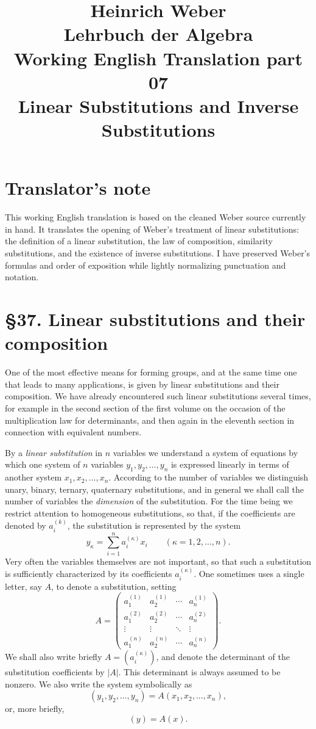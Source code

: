 \documentclass[11pt]{article}
\title{Heinrich Weber\\Lehrbuch der Algebra\\Working English Translation part 07\\Linear Substitutions and Inverse Substitutions}
\author{}
\date{}
\begin{document}
\maketitle

\section*{Translator's note}
This working English translation is based on the cleaned Weber source currently in hand. It translates the opening of Weber's treatment of linear substitutions: the definition of a linear substitution, the law of composition, similarity substitutions, and the existence of inverse substitutions. I have preserved Weber's formulas and order of exposition while lightly normalizing punctuation and notation.

\section*{\S 37. Linear substitutions and their composition}

One of the most effective means for forming groups, and at the same time one that leads to many applications, is given by linear substitutions and their composition. We have already encountered such linear substitutions several times, for example in the second section of the first volume on the occasion of the multiplication law for determinants, and then again in the eleventh section in connection with equivalent numbers.

By a \emph{linear substitution} in \(n\) variables we understand a system of equations by which one system of \(n\) variables \(y_1,y_2,\dots,y_n\) is expressed linearly in terms of another system \(x_1,x_2,\dots,x_n\). According to the number of variables we distinguish unary, binary, ternary, quaternary substitutions, and in general we shall call the number of variables the \emph{dimension} of the substitution. For the time being we restrict attention to homogeneous substitutions, so that, if the coefficients are denoted by \(a^{(k)}_i\), the substitution is represented by the system
\[
y_\kappa=\sum_{i=1}^n a^{(\kappa)}_i x_i
\qquad (\kappa=1,2,\dots,n).
\tag{1}
\]
Very often the variables themselves are not important, so that such a substitution is sufficiently characterized by its coefficients \(a^{(\kappa)}_i\). One sometimes uses a single letter, say \(A\), to denote a substitution, setting
\[
A=
\begin{pmatrix}
a^{(1)}_1 & a^{(1)}_2 & \cdots & a^{(1)}_n \\
a^{(2)}_1 & a^{(2)}_2 & \cdots & a^{(2)}_n \\
\vdots & \vdots & \ddots & \vdots \\
a^{(n)}_1 & a^{(n)}_2 & \cdots & a^{(n)}_n
\end{pmatrix}.
\tag{2}
\]
We shall also write briefly \(A=(a^{(\kappa)}_i)\), and denote the determinant of the substitution coefficients by \(|A|\). This determinant is always assumed to be nonzero. We also write the system symbolically as
\[
(y_1,y_2,\dots,y_n)=A(x_1,x_2,\dots,x_n),
\tag{3}
\]
or, more briefly,
\[
(y)=A(x).
\tag{4}
\]
\end{document}
